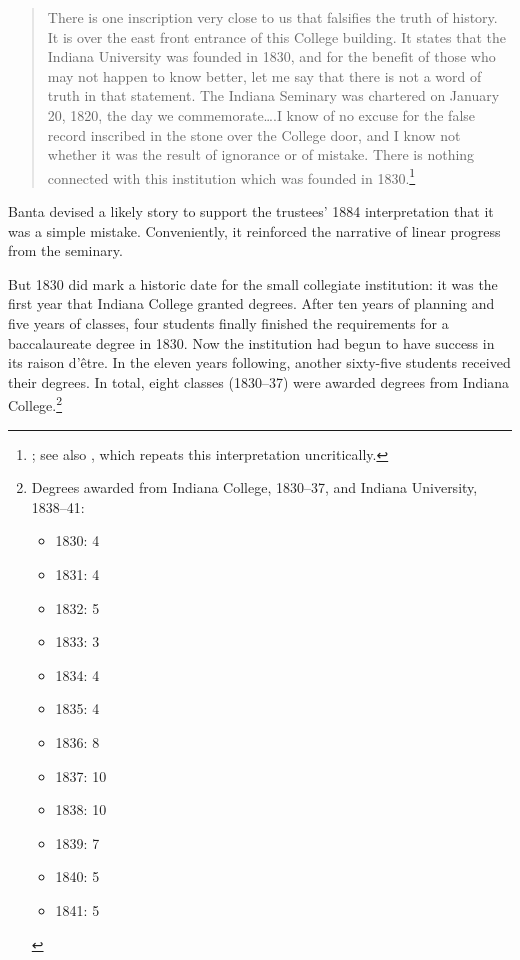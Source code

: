 \documentclass[
  american,
  letterpaper,
]{scrreprt}
\providecommand{\tightlist}{%
  \setlength{\itemsep}{0pt}\setlength{\parskip}{0pt}}\usepackage{longtable,booktabs,array}
\begin{document}
\begin{quote}
There is one inscription very close to us that falsifies the truth of
history. It is over the east front entrance of this College building. It
states that the Indiana University was founded in 1830, and for the
benefit of those who may not happen to know better, let me say that
there is not a word of truth in that statement. The Indiana Seminary was
chartered on January 20, 1820, the day we commemorate\ldots.I know of no
excuse for the false record inscribed in the stone over the College
door, and I know not whether it was the result of ignorance or of
mistake. There is nothing connected with this institution which was
founded in 1830.\footnote{; see
  also , which repeats this interpretation
  uncritically.}
\end{quote}

Banta devised a likely story to support the trustees' 1884
interpretation that it was a simple mistake. Conveniently, it reinforced
the narrative of linear progress from the seminary.

But 1830 did mark a historic date for the small collegiate institution:
it was the first year that Indiana College granted degrees. After ten
years of planning and five years of classes, four students finally
finished the requirements for a baccalaureate degree in 1830. Now the
institution had begun to have success in its raison d'être. In the
eleven years following, another sixty-five students received their
degrees. In total, eight classes (1830--37) were awarded degrees from
Indiana College.\footnote{Degrees awarded from Indiana College,
  1830--37, and Indiana University, 1838--41:

  \begin{itemize}
  \tightlist
  \item
    1830: 4
  \item
    1831: 4
  \item
    1832: 5
  \item
    1833: 3
  \item
    1834: 4
  \item
    1835: 4
  \item
    1836: 8
  \item
    1837: 10
  \item
    1838: 10
  \item
    1839: 7
  \item
    1840: 5
  \item
    1841: 5
  \end{itemize}}
\end{document}

